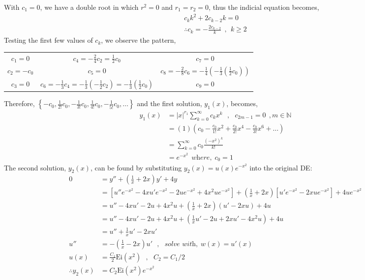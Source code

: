 \documentclass{article}
\begin{document}
With $c_1=0$, we have a double root in which $r^2 =0$ and $r_1=r_2=0$, thus the indicial equation becomes,
\begin{align*}
    c_k k^2 + 2c_{k-2} k=0\\
    \therefore c_k = -\frac{2c_{k-2}}{k} \:\:,\:\: k\geq 2
\end{align*}
Testing the first few values of $c_k$, we observe the pattern,
\begin{center}
\begin{tabular}{ c c c }
 $c_1=0$ & $c_4=-\frac{2}{4}c_2 = \frac{1}{2}c_0$ & $c_7=0$ \\ 
 $c_2 =-c_0$ & $c_5=0$ & $c_8 = -\frac{2}{8}c_6 =-\frac{1}{4}\left( -\frac{1}{3}\left(\frac{1}{2}c_0 \right)\right) $ \\  
 $c_3=0$ & $c_6=-\frac{1}{3}c_4 =-\frac{1}{3}\left(-\frac{1}{2}c_2 \right)=-\frac{1}{3}\left(\frac{1}{2}c_0 \right)$ & $c_9=0$
\end{tabular}
\end{center}
Therefore, $\left\{ -c_0 , \frac{1}{2!}c_0,-\frac{1}{3!}c_0, \frac{1}{4!}c_0, -\frac{1}{5!}c_0 ,\dots \right\}$ and the first solution, $y_1 (x)$, becomes,
\begin{align*}
    y_1 (x) &= \left | x\right |^{r_{1}} \sum_{k=0}^{\infty}c_k x^{k} \:\:\:,\:\:\: c_{2m-1}=0\:\:,m\in \mathbb{N}\\
    &= (1)\left( c_0 -\frac{c_0}{1!}x^2 + \frac{c_0}{2!}x^4 - \frac{c_0}{3!}x^6 +\dots \right)\\
    &= \sum_{k=0}^{\infty}c_0\frac{(-x^2)^k}{k!}\\
    &=e^{-x^2} \:\:\textit{where,}\:\: c_0=1
\end{align*}
The second solution, $y_2(x)$, can be found by substituting $y_2 (x)=u(x)e^{-x^2}$ into the original DE:
\begin{align*}
    0 &= y'' + \left(\frac{1}{x}+2x \right)y' +4y \\
    &= \left[ u''e^{-x^2} - 4xu'e^{-x^2} -2ue^{-x^2}+4x^2 ue^{-x^2} \right] + \left(\frac{1}{x}+2x \right)\left[ u'e^{-x^2} -2xue^{-x^2} \right] +4ue^{-x^2} \\
    &= u'' - 4xu' -2u +4x^2 u + \left(\frac{1}{x}+2x \right)\left( u' -2xu \right) +4u \\
    &= u'' - 4xu' -2u +4x^2 u + \left( \frac{1}{x}u' -2u+2xu' - 4x^2 u \right)+4u \\
    &= u'' +\frac{1}{x}u'-2xu'  \\
    u''&= -\left(\frac{1}{x}-2x \right)u' \:\:\:,\:\:\: \textit{solve with,}\:\: w(x)=u'(x)\\
    u(x)&= \frac{C_1}{2} \text{Ei}(x^2) \:\:\:,\:\:\: C_2 =C_1 /2\\
    \therefore y_2 (x)&= C_2 \text{Ei}(x^2) e^{-x^2} 
\end{align*}
\end{document}
